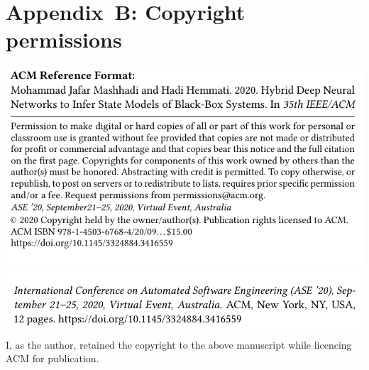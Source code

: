 \chapter{Appendix~B: Copyright permissions}\label{appendixb}
\includegraphics[width=\textwidth]{Copyright.png}
\includegraphics[width=\textwidth]{Copyright2.png}
I, as the author, retained the copyright to the above manuscript while licencing ACM for publication.
